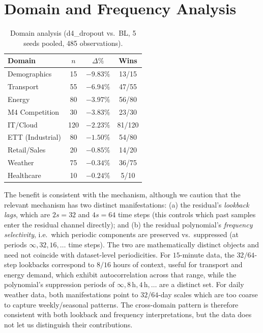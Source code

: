 \documentclass[11pt]{article}
\theoremstyle{plain}
\theoremstyle{definition}
\theoremstyle{remark}
\newcommand{\HD}{\textsf{d4\_dropout}}
\begin{document}
\section{Domain and Frequency Analysis}
\label{app:domain}

\begin{table}[h]
\centering
\caption{Domain analysis (\HD{} vs.\ BL, 5 seeds pooled, 485 observations).}
\small
\begin{tabular}{lccc}
\toprule
\textbf{Domain} & \textbf{$n$} & \textbf{$\Delta\%$} & \textbf{Wins} \\
\midrule
Demographics & 15 & $-9.83\%$ & 13/15 \\
Transport & 55 & $-6.94\%$ & 47/55 \\
Energy & 80 & $-3.97\%$ & 56/80 \\
M4 Competition & 30 & $-3.83\%$ & 23/30 \\
IT/Cloud & 120 & $-2.23\%$ & 81/120 \\
ETT (Industrial) & 80 & $-1.50\%$ & 54/80 \\
Retail/Sales & 20 & $-0.85\%$ & 14/20 \\
Weather & 75 & $-0.34\%$ & 36/75 \\
Healthcare & 10 & $-0.24\%$ & 5/10 \\
\bottomrule
\end{tabular}
\end{table}

The benefit is consistent with the mechanism, although we caution that the relevant mechanism has two distinct manifestations: (a) the residual's \emph{lookback lags}, which are $2s = 32$ and $4s = 64$ time steps (this controls which past samples enter the residual channel directly); and (b) the residual polynomial's \emph{frequency selectivity}, i.e.\ which periodic components are preserved vs.\ suppressed (at periods $\infty, 32, 16, \ldots$ time steps). The two are mathematically distinct objects and need not coincide with dataset-level periodicities. For $15$-minute data, the $32/64$-step lookbacks correspond to $8/16$ hours of context, useful for transport and energy demand, which exhibit autocorrelation across that range, while the polynomial's suppression periods of $\infty, 8\,\text{h}, 4\,\text{h}, \ldots$ are a distinct set. For daily weather data, both manifestations point to $32$/$64$-day scales which are too coarse to capture weekly/seasonal patterns. The cross-domain pattern is therefore consistent with both lookback and frequency interpretations, but the data does not let us distinguish their contributions.
\end{document}
